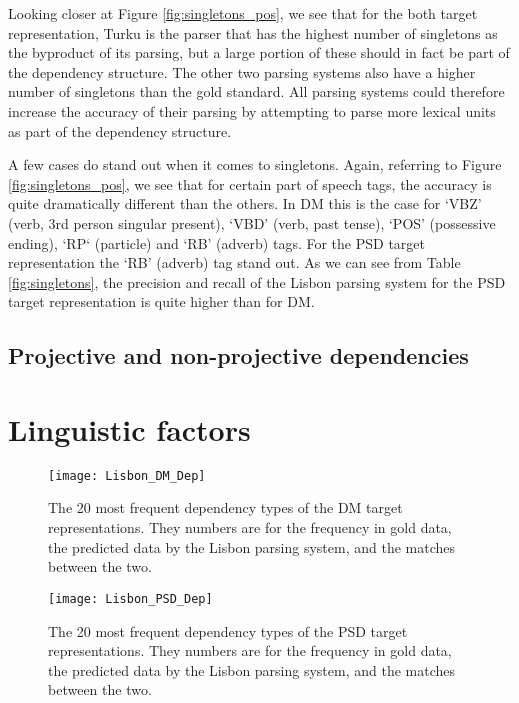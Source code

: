 Looking closer at Figure \ref{fig:singletons_pos}, we see that for the both target representation, Turku is the parser that has the highest number of singletons as the byproduct of its parsing, but a large portion of these should in fact be part of the dependency structure. The other two parsing systems also have a higher number of singletons than the gold standard. All parsing systems could therefore increase the accuracy of their parsing by attempting to parse more lexical units as part of the dependency structure.

A few cases do stand out when it comes to singletons. Again, referring to Figure \ref{fig:singletons_pos}, we see that for certain part of speech tags, the accuracy is quite dramatically different than the others. In DM this is the case for `VBZ' (verb, 3rd person singular present), `VBD' (verb, past tense), `POS' (possessive ending), `RP` (particle) and `RB' (adverb) tags. For the PSD target representation the `RB' (adverb) tag stand out. As we can see from Table \ref{fig:singletons}, the precision and recall of the Lisbon parsing system for the PSD target representation is quite higher than for DM.

\subsection{Projective and non-projective dependencies}


\section{Linguistic factors}

\begin{figure}[h]
    \centering
    \begin{minipage}{0.8\textwidth}
        \centering
        \texttt{[image: Lisbon\_DM\_Dep]}
    \end{minipage}\hfill
    \caption{The 20 most frequent dependency types of the DM target representations. They numbers are for the frequency in gold data, the predicted data by the Lisbon parsing system, and the matches between the two.}
    \label{fig:lisbon_dep_1}
\end{figure}

\begin{figure}[h]
    \centering
    \begin{minipage}{0.8\textwidth}
        \centering
        \texttt{[image: Lisbon\_PSD\_Dep]}
    \end{minipage}
    \caption{The 20 most frequent dependency types of the PSD target representations. They numbers are for the frequency in gold data, the predicted data by the Lisbon parsing system, and the matches between the two.}
    \label{fig:lisbon_dep_2}
\end{figure}

